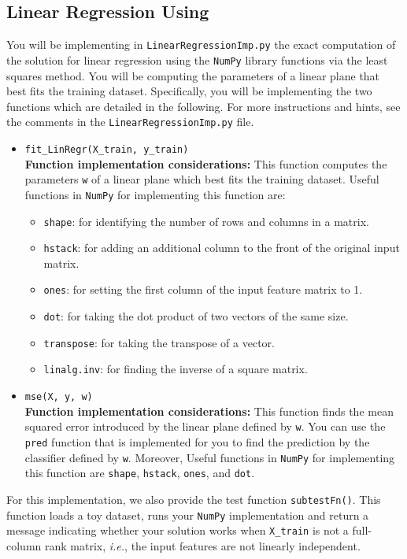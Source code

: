 \documentclass{article}
\theoremstyle{definition}
\begin{document}
\subsection{Linear Regression Using } \label{part2.1}
You will be implementing in \verb|LinearRegressionImp.py| the exact computation of the solution for linear
regression using the \verb|NumPy| library functions via the least squares method. You will be computing the
parameters of a linear plane that best fits the training dataset. Specifically, you will be implementing the two
functions which are detailed in the following. For more instructions and hints, see the comments in the \verb|LinearRegressionImp.py|
file.
\begin{itemize}
	\item{\verb|fit_LinRegr(X_train, y_train)|\\\textbf{Function implementation considerations:} This function computes the parameters \verb|w| of a linear plane which best fits the training dataset. Useful functions in \verb|NumPy| for implementing this function are: 
		\begin{itemize}
			\item \verb|shape|: for identifying the number of rows and columns in a matrix.
			\item \verb|hstack|: for adding an additional column to the front of the original input matrix.
			\item \verb|ones|: for setting the first column of the input feature matrix to 1.
			\item \verb|dot|: for taking the dot product of two vectors of the same size.
			\item \verb|transpose|: for taking the transpose of a vector.
			\item \verb|linalg.inv|: for finding the inverse of a square matrix.
		\end{itemize}}
		\item{\verb|mse(X, y, w)|\\\textbf{Function implementation considerations:} This function finds the mean squared error introduced by the linear plane defined by
			\verb|w|. You can use the \verb|pred| function that is implemented for you to find the prediction by the classifier defined by \verb|w|.  Moreover, Useful functions in \verb|NumPy| for implementing this function are \verb|shape|, \verb|hstack|, \verb|ones|, and \verb|dot|.}
\end{itemize}
For this implementation, we also provide the test function \verb|subtestFn()|. This function loads a toy dataset,
runs your \verb|NumPy| implementation and return a message indicating whether your solution works when
\verb|X_train| is not a full-column rank matrix, \textit{i.e.}, the input features are not linearly independent.\\
\end{document}
